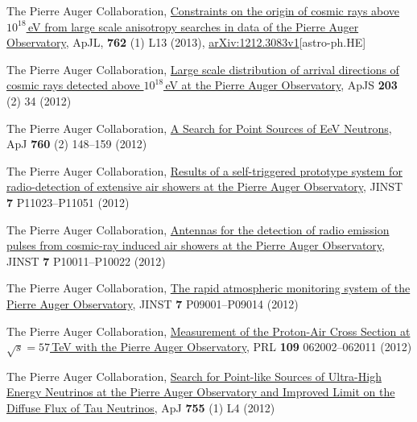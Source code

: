 \begin{etaremune}
\item {}The Pierre Auger Collaboration, \href{http://dx.doi.org/10.1088/2041-8205/762/1/L13}{{Constraints on the origin of cosmic rays above $10^{18}$\,eV from large scale anisotropy searches in data of the Pierre Auger Observatory}}, ApJL, {\bf{762}} (1) L13 (2013), \href{http://arxiv.org/abs/1212.3083}{arXiv:1212.3083v1}[astro-ph.HE]

\item {}The Pierre Auger Collaboration,
\href{http://dx.doi.org/10.1088/0067-0049/203/2/34}{{Large scale
distribution of arrival directions of cosmic rays detected above $10^{18}$\,eV
at the Pierre Auger Observatory}}, ApJS {\bf{203}} (2) 34 (2012)

\item {}The Pierre Auger Collaboration,
\href{http://dx.doi.org/10.1088/0004-637X/760/2/148}{{A Search for Point
Sources of EeV Neutrons}}, ApJ {\bf{760}} (2) 148--159 (2012)

\item {}The Pierre Auger Collaboration,
\href{http://dx.doi.org/10.1088/1748-0221/7/11/P11023}{{Results of a
self-triggered prototype system for radio-detection of extensive air showers at
the Pierre Auger Observatory}}, JINST {\bf{7}} P11023--P11051 (2012)

\item {}The Pierre Auger Collaboration,
\href{http://dx.doi.org/10.1088/1748-0221/7/10/P10011}{{Antennas for the
detection of radio emission pulses from cosmic-ray induced air showers at the
Pierre Auger Observatory}}, JINST {\bf{7}} P10011--P10022 (2012)

\item {}The Pierre Auger Collaboration,
\href{http://dx.doi.org/10.1088/1748-0221/7/09/P09001}{{The rapid
atmospheric monitoring system of the Pierre Auger Observatory}}, JINST
{\bf{7}} P09001--P09014 (2012)

\item {}The Pierre Auger Collaboration,
\href{http://dx.doi.org/10.1103/PhysRevLett.109.062002}{{Measurement of
the Proton-Air Cross Section at $\sqrt{s}=57$\,TeV with the Pierre Auger
Observatory}}, PRL {\bf{109}} 062002--062011 (2012)

\item {}The Pierre Auger Collaboration,
\href{http://dx.doi.org/10.1088/2041-8205/755/1/L4}{{Search for Point-like
Sources of Ultra-High Energy Neutrinos at the Pierre Auger Observatory and
Improved Limit on the Diffuse Flux of Tau Neutrinos}}, ApJ {\bf{755}} (1) L4
(2012)


\end{etaremune}
